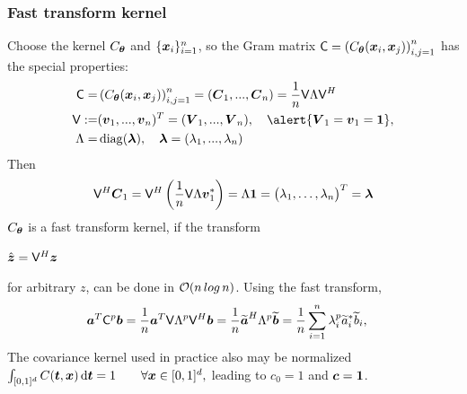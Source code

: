 \documentclass[10pt,compress,xcolor={usenames,dvipsnames}]{beamer} %
\renewcommand{\mLambda}{\Lambda}
\newcommand{\vC}{\bvec{C}}
\newcommand{\D}[1]{\text{d}{#1}}
\newcommand{\redroundmathbox}[1]{\parbox{\widthof{$#1$\hspace{1em}}}
	{\begin{mdframed}[style=redshade]\centering $#1$ \end{mdframed}}}
\begin{document}
\begin{frame}
\frametitle{Fast transform kernel}
\vspace{-5ex}
Choose the kernel $C_{\boldsymbol{\theta}}$ and $\{\boldsymbol{x}_i\}_{i=1}^n$, so the Gram matrix $\mathsf{C} =  \left( C_{\boldsymbol{\theta}} (\boldsymbol{x}_i,\boldsymbol{x}_j) \right)_{i,j=1}^n$ has the special properties:
\vspace{-2ex}
\begin{align*}
\mC =& \left( C_{\vtheta} (\vx_i,\vx_j) \right)_{i,j=1}^n 
= (\vC_1,...,\vC_n)
=  \frac 1n \mV \mLambda \mV^H 
\\
\mV :=& (\vv_1,...,\vv_n)^T = (\vV_1,...,\vV_n), \quad
\alert{\vV_1 = \vv_1 = \vone}, 
\\ 
\mLambda =& \diag (\vlambda), \quad \vlambda = (\lambda_1,...,\lambda_n)
\end{align*}
Then
\pause 
\vspace{-4ex}
\begin{align*}
\mV^H \vC_1 = \mV^H \left( \frac 1n \mV \mLambda \vv_1^* \right) =
 \mLambda \vone =
\begin{pmatrix}
\lambda_1, \hdots, \lambda_n
\end{pmatrix}^T = \vlambda
\end{align*}
\vspace{-1ex}
$C_{\boldsymbol{\theta}}$ is a fast transform kernel, if the transform 
{\redroundmathbox{ { \text{$\hat{\vz} = \mV^H \vz$ }  } } }
for arbitrary $z$, can be done in \alert{$\operatorname{{\mathcal O}}( n \, log\, n) $}. Using the fast transform,
\vspace{-1ex}
\begin{align*}
\va^T\mC^p\vb &= \frac 1n \va^T \mV \mLambda^p \mV^H \vb
= \frac 1n \widetilde{\va}^H\mLambda^p \widetilde{\vb}
= \frac 1n \sum_{i=1}^n \lambda_i^p \widetilde{a}_i^* \widetilde{b}_i, 
\end{align*}
The covariance kernel used in practice also may be normalized 
$
\int_{[0,1]^d} C(\vt,\vx) \, \D \vt = 1 \qquad \forall \vx \in [0,1]^d,
$
leading to $c_0 = 1$ and $\boldsymbol{c} = \boldsymbol{1}$.
\end{frame}
\end{document}
